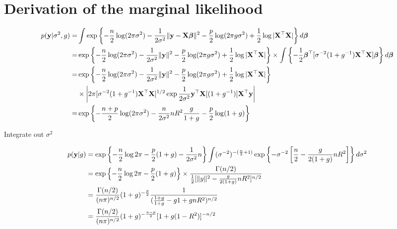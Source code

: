 \documentclass{amsart}[12pt]
\theoremstyle{definition}
\begin{document}
\section{Derivation of the marginal likelihood}
\begin{align*}
	p({\bf y}|\sigma^2, g) = & \int \exp \left \{ -\frac{n}{2} \log(2 \pi \sigma^2)                                                                                                               
	- \frac{1}{2 \sigma^2} \|{\bf y} - {\bf X} {\boldsymbol \beta}\|^2
	- \frac{p}{2} \log(2 \pi g \sigma^2) + \frac{1}{2} \log |{\bf X}^\top {\bf X}| \right \} d {\boldsymbol \beta} \\
	=                    & \exp \left \{ -\frac{n}{2} \log(2 \pi \sigma^2)  - \frac{1}{2 \sigma^2} \|{\bf y}\|^2 - \frac{p}{2} \log(2 \pi g \sigma^2) + \frac{1}{2} \log |{\bf X}^\top {\bf X}| \right \} 
	\times \int \left \{ -\frac{1}{2} {\boldsymbol \beta}^\top [\sigma^{-2} (1 + g^{-1}) {\bf X}^\top {\bf X}] {\boldsymbol\beta} \right \} d {\boldsymbol \beta} \\
	=                    & \exp \left \{ -\frac{n}{2} \log(2 \pi \sigma^2)  - \frac{1}{2 \sigma^2} \|{\bf y}\|^2 - \frac{p}{2} \log(2 \pi g \sigma^2) + \frac{1}{2} \log |{\bf X}^\top {\bf X}| \right \} \\
	                     & \times \left |2 \pi [\sigma^{-2}(1 + g^{-1}) {\bf X}^\top {\bf X}]^{1/2}                                                                                                   
	\exp{\frac{1}{2 \sigma^2} {\bf y}^\top {\bf X}[(1 + g^{-1})] {\bf X}^\top {\bf y}} \right | \\
	=                    & \exp \left \{ -\frac{n+p}{2} \log(2 \pi \sigma^2) - \frac{n}{2 \sigma^2} n R^2 \frac{g}{1 + g} - \frac{p}{2} \log(1 + g) \right \}                                 
\end{align*}

Integrate out $\sigma^2$

\begin{align*}
	p({\bf y} | g) & = \exp \left \{ -\frac{n}{2} \log 2 \pi - \frac{p}{2} (1 + g) - \frac{1}{2 \sigma^2} n  \right \}                   
	\int (\sigma^{-2})^{-(\frac{n}{2} + 1)} \exp \left \{- \sigma^{-2} \left[ \frac{n}{2} - \frac{g}{2(1 + g)} n R^2 \right]\right \} d \sigma^2 \\
	           & = \exp \left \{ -\frac{n}{2} \log 2 \pi - \frac{p}{2} (1 + g) \right \}                                             
	\times \frac{\Gamma(n/2)}{\frac{1}{2}[\|y\|^2 - \frac{g}{2(1 + g)} n R^2]^{n/2}} \\
	           & = \frac{\Gamma(n/2)}{(n \pi)^{n/2}} (1 + g)^{-\frac{p}{2}} \frac{1}{(\frac{1 + g}{1 + g} - {g}{1 + g} n R^2)^{n/2}} \\
	           & = \frac{\Gamma(n/2)}{(n \pi)^{n/2}} (1 + g)^{-\frac{n - p}{2}} [1 + g(1 - R^2)]^{-n/2}                              \\
\end{align*}
\end{document}

